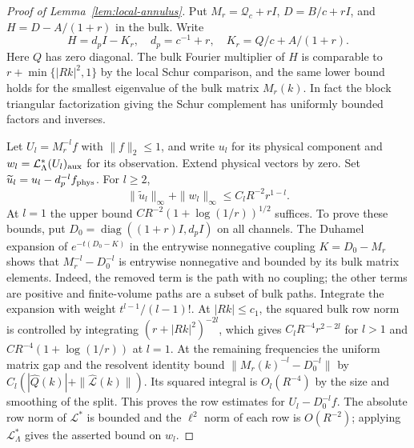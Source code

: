 \documentclass[11pt]{article}
\theoremstyle{definition}
\begin{document}
\begin{proof}[Proof of Lemma~\ref{lem:local-annulus}]
Put \(M_r=\mathcal Q_c+rI\), \(D=B/c+rI\), and
\(H=D-A/(1+r)\) in the bulk. Write
\begin{equation}
 H=d_pI-K_r,\quad d_p=c^{-1}+r,\quad K_r=Q/c+A/(1+r).
\end{equation}
Here \(Q\) has zero diagonal. The bulk Fourier multiplier of
\(H\) is comparable to \(r+\min\{|Rk|^2,1\}\) by the local
Schur comparison, and the same lower bound holds for the
smallest eigenvalue of the bulk matrix \(M_r(k)\). In fact the
block triangular factorization giving the Schur complement
has uniformly bounded factors and inverses.

Let \(U_l=M_r^{-l}f\) with \(\|f\|_2\le1\), and write \(u_l\)
for its physical component and \(w_l=\mathcal L_\Lambda^*
(U_l)_{\rm aux}\) for its observation. Extend physical vectors
by zero. Set \(\widetilde u_l=u_l-d_p^{-l}f_{\rm phys}\).
For \(l\ge2\),
\begin{equation}
 \|\widetilde u_l\|_\infty+\|w_l\|_\infty
 \le C_l R^{-2}r^{1-l}.
 \label{eq:local-rows}
\end{equation}
At \(l=1\) the upper bound \(CR^{-2}(1+\log(1/r))^{1/2}\)
suffices. To prove these bounds, put
\(D_0=\operatorname{diag}((1+r)I,d_pI)\) on all channels.
The Duhamel expansion of \(e^{-t(D_0-K)}\) in the
entrywise nonnegative coupling \(K=D_0-M_r\) shows that
\(M_r^{-l}-D_0^{-l}\) is entrywise nonnegative and bounded by
its bulk matrix elements. Indeed, the removed term is the
path with no coupling; the other terms are positive and finite-volume
paths are a subset of bulk paths. Integrate the expansion with
weight \(t^{l-1}/(l-1)!\). At \(|Rk|\le c_1\), the squared
bulk row norm is controlled by integrating \((r+|Rk|^2)^{-2l}\),
which gives \(C_l R^{-4} r^{2-2l}\) for \(l>1\) and
\(CR^{-4}(1+\log(1/r))\) at \(l=1\). At the remaining
frequencies the uniform matrix gap and the resolvent identity
bound \(\|M_r(k)^{-l}-D_0^{-l}\|\) by
\(C_l (|\widehat Q(k)|+\|\widehat{\mathcal L}(k)\|)\).
Its squared integral is \(O_l(R^{-4})\) by the size and
smoothing of the split. This proves the row estimates for
\(U_l-D_0^{-l}f\). The absolute row norm of \(\mathcal L^*\)
is bounded and the \(\ell^2\) norm of each row is \(O(R^{-2})\);
applying \(\mathcal L_\Lambda^*\) gives the asserted bound on
\(w_l\).


\end{proof}
\end{document}
